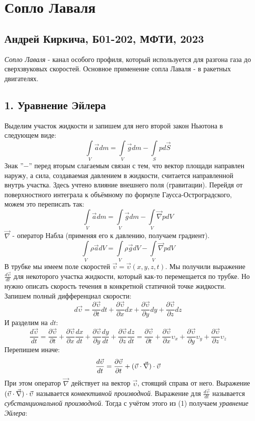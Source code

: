 

	
	\section*{Сопло Лаваля}
	\subsection*{Андрей Киркича, Б01-202, МФТИ, 2023}
	\n\n
	\textit{Сопло Лаваля} - канал особого профиля, который используется для разгона газа до сверхзвуковых скоростей.\n\n
	Основное применение сопла Лаваля - в ракетных двигателях.
	\subsection*{1. Уравнение Эйлера}
	Выделим участок жидкости и запишем для него второй закон Ньютона в следующем виде:
	\[\int \limits_V \vec{a} dm = \int \limits_V \vec{g} dm - \int \limits_S p d\vec{S}\]
	Знак ''$-$'' перед вторым слагаемым связан с тем, что вектор площади направлен наружу, а сила, создаваемая давлением в жидкости, считается направленной внутрь участка.\n
	Здесь учтено влияние внешнего поля (гравитации).\n\n
	Перейдя от поверхностного интеграла к объёмному по формуле Гаусса-Остроградского, можем это переписать так:
	\[\int \limits_V \vec{a} dm = \int \limits_V \vec{g} dm - \int \limits_V \vec{\nabla}p dV\]
	$\vec{\nabla}$ - оператор Набла (применяя его к давлению, получаем градиент).
	\[\int \limits_V \rho \vec{a} dV = \int \limits_V \rho \vec{g} dV - \int \limits_V \vec{\nabla}p dV\]
	\n
	В трубке мы имеем поле скоростей $\vec{\upsilon} = \vec{\upsilon}(x, y, z, t)$. Мы получили выражение $\frac{d\vec{\upsilon}}{dt}$ для некоторого участка жидкости, который как-то перемещается по трубке. Но нужно описать скорость течения в конкретной статичной точке жидкости.\n\n
	Запишем полный дифференциал скорости:
	\[d\vec{\upsilon} = \frac{\partial \vec{\upsilon}}{\partial t} dt + \frac{\partial \vec{\upsilon}}{\partial x}dx + \frac{\partial\vec{\upsilon}}{\partial y}dy + \frac{\partial \vec{\upsilon}}{\partial z}dz\]
	И разделим на $dt$:
	\[\frac{d\vec{\upsilon}}{dt} = \frac{\partial \vec{\upsilon}}{\partial t} + \frac{\partial \vec{\upsilon}}{\partial x}\frac{dx}{dt} + \frac{\partial\vec{\upsilon}}{\partial y}\frac{dy}{dt} + \frac{\partial \vec{\upsilon}}{\partial z}\frac{dz}{dt} = \frac{\partial \vec{\upsilon}}{\partial t} + \frac{\partial \vec{\upsilon}}{\partial x}\upsilon_{x} + \frac{\partial\vec{\upsilon}}{\partial y}\upsilon_{y} + \frac{\partial \vec{\upsilon}}{\partial z}\upsilon_{z}\]
	Перепишем иначе:
	\[\frac{d\vec{\upsilon}}{dt} = \frac{\partial \vec{\upsilon}}{\partial t} + (\vec{\upsilon} \cdot \vec{\nabla}) \cdot \vec{\upsilon}\]
	При этом оператор $\vec{\nabla}$ действует на вектор $\vec{\upsilon}$, стоящий справа от него.\n\n
	Выражение $(\vec{\upsilon} \cdot \vec{\nabla}) \cdot \vec{\upsilon}$ называется \textit{конвективной производной}.\n
	Выражение для $\frac{d\vec{\upsilon}}{dt}$ называется \textit{субстанциональной производной}.\n\n
	Тогда с учётом этого из (1) получаем \textit{уравнение Эйлера}:
	\be{\frac{\partial \vec{\upsilon}}{\partial t} + (\vec{\upsilon} \x \vec{\nabla}) \x \vec{\upsilon} = \vec{g} - \frac{1}{\rho} \vec{\nabla}p}
	\n
